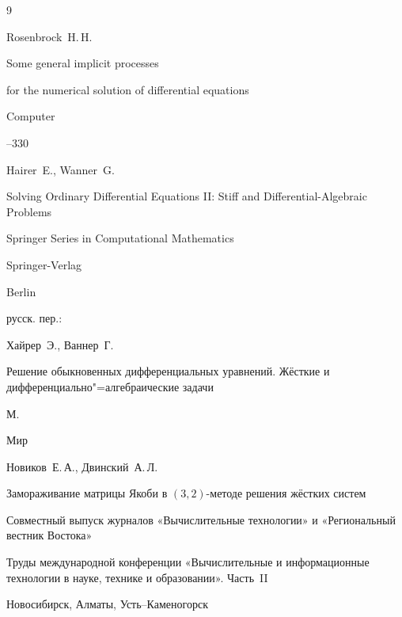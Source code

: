 \begin{thebibliography}{9}




\by Rosenbrock~H.\,H.

\paper  Some general implicit processes

for the numerical solution of differential equations

\jour Computer




--330




\by Hairer~E., Wanner~G. 

\book Solving Ordinary Differential Equations II: Stiff and Differential-Algebraic Problems

\serial Springer Series in Computational Mathematics


\publ Springer-Verlag

\publaddr Berlin



\rtransl русск. пер.:~

\by Хайрер~Э., Ваннер~Г.

\book Решение обыкновенных дифференциальных уравнений. Жёсткие и дифференциально"=алгебраические задачи

\publaddr М.

\publ Мир






\by Новиков~Е.\,А., Двинский~А.\,Л.

\paper Замораживание матрицы Якоби в $(3, 2)$-методе решения жёстких систем

\inbook Совместный выпуск журналов «Вычислительные технологии» и «Региональный вестник Востока» 

\bookinfo Труды международной конференции «Вычислительные и информационные технологии в науке, технике и образовании».  Часть~II

\publaddr Новосибирск, Алматы, Усть–Каменогорск



\end{thebibliography}
